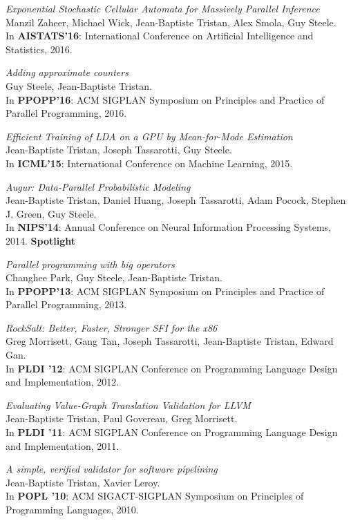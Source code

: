 \documentclass[margin,line]{res}
\begin{document}
\begin{resume}
\emph{Exponential Stochastic Cellular Automata for Massively Parallel Inference}\\
Manzil Zaheer, Michael Wick, Jean-Baptiste Tristan, Alex Smola, Guy Steele.\\
In {\bf AISTATS'16}: International Conference on 
Artificial Intelligence and Statistics, 2016. 

\emph{Adding approximate counters}\\
Guy Steele, Jean-Baptiste Tristan.\\
In {\bf PPOPP'16}: ACM SIGPLAN Symposium on
Principles and Practice of Parallel Programming, 2016. 

\emph{Efficient Training of LDA on a GPU by Mean-for-Mode Estimation}\\
Jean-Baptiste Tristan, Joseph Tassarotti, Guy Steele.\\
In {\bf ICML'15}: International Conference on Machine Learning, 2015. 

\emph{Augur: Data-Parallel Probabilistic Modeling}\\
Jean-Baptiste Tristan, Daniel Huang, Joseph Tassarotti, Adam Pocock, Stephen J. Green, Guy Steele.\\
In {\bf NIPS'14}: Annual Conference on Neural Information Processing Systems, 2014. {\bf Spotlight}

\emph{Parallel programming with big operators}\\
Changhee Park, Guy Steele, Jean-Baptiste Tristan.\\
In {\bf PPOPP'13}: ACM SIGPLAN Symposium on
Principles and Practice of Parallel Programming, 2013. 

\emph{RockSalt: Better, Faster, Stronger SFI for the x86}\\
Greg Morrisett, Gang Tan, Joseph Tassarotti, Jean-Baptiste Tristan, Edward Gan.\\
In {\bf PLDI '12}: ACM SIGPLAN Conference on Programming
Language Design and Implementation, 2012. 

\emph{Evaluating Value-Graph Translation Validation for LLVM}\\
Jean-Baptiste Tristan, Paul Govereau, Greg Morrisett.\\
In {\bf PLDI '11}: ACM SIGPLAN Conference on Programming
Language Design and Implementation, 2011. 

\emph{A simple, verified validator for software pipelining}\\
Jean-Baptiste Tristan, Xavier Leroy.\\
In {\bf POPL '10}: ACM SIGACT-SIGPLAN Symposium on
Principles of Programming Languages, 2010.


\end{resume}
\end{document}
